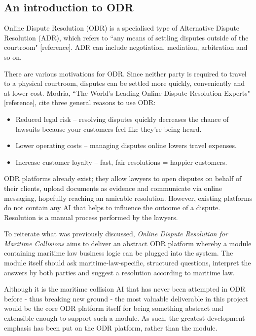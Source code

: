\subsection{An introduction to ODR}

Online Dispute Resolution (ODR) is a specialised type of Alternative Dispute Resolution (ADR), which refers to ``any means of settling disputes outside of the courtroom" [reference]. ADR can include negotiation, mediation, arbitration and so on. %

There are various motivations for ODR. Since neither party is required to travel to a physical courtroom, disputes can be settled more quickly, conveniently and at lower cost. Modria, ``The World’s Leading Online Dispute Resolution Experts" [reference], cite three general reasons to use ODR: %

\begin{itemize}
    \item Reduced legal risk – resolving disputes quickly decreases the chance of lawsuits because your customers feel like they’re being heard.
    \item Lower operating costs – managing disputes online lowers travel expenses.
    \item Increase customer loyalty – fast, fair resolutions = happier customers.
\end{itemize}

ODR platforms already exist; they allow lawyers to open disputes on behalf of their clients, upload documents as evidence and communicate via online messaging, hopefully reaching an amicable resolution. However, existing platforms do not contain any AI that helps to influence the outcome of a dispute. Resolution is a manual process performed by the lawyers.

To reiterate what was previously discussed, \emph{Online Dispute Resolution for Maritime Collisions} aims to deliver an abstract ODR platform whereby a module containing maritime law business logic can be plugged into the system. The module itself should ask maritime-law-specific, structured questions, interpret the answers by both parties and suggest a resolution according to maritime law.

Although it is the maritime collision AI that has never been attempted in ODR before - thus breaking new ground - the most valuable deliverable in this project would be the core ODR platform itself for being something abstract and extensible enough to support such a module. As such, the greatest development emphasis has been put on the ODR platform, rather than the module.

